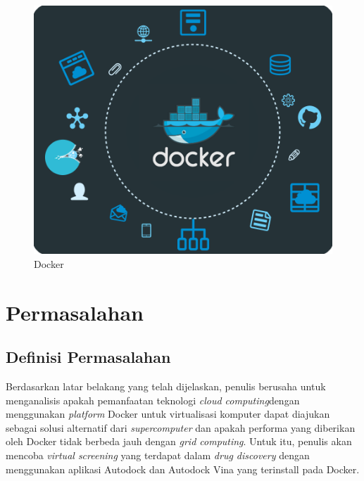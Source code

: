 \begin{figure}
	\centering
	\includegraphics{docker.png}
	\caption{Docker}
\end{figure}

 

\section{Permasalahan}
\subsection{Definisi Permasalahan}
Berdasarkan latar belakang yang telah dijelaskan, penulis berusaha untuk menganalisis apakah pemanfaatan teknologi \textit{cloud computing}dengan menggunakan \textit{platform} Docker untuk virtualisasi komputer dapat diajukan sebagai solusi alternatif dari \textit{supercomputer} dan apakah performa yang diberikan oleh Docker tidak berbeda jauh dengan \textit{grid computing}. Untuk itu, penulis akan mencoba \textit{virtual screening} yang terdapat dalam \textit{drug discovery} dengan menggunakan aplikasi Autodock dan Autodock Vina yang terinstall pada Docker.

